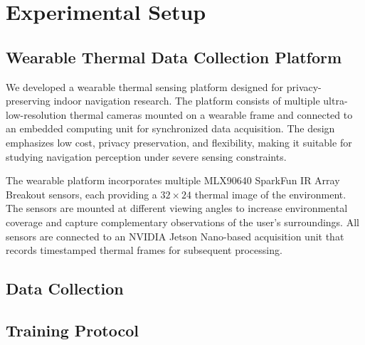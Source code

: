 \section{Experimental Setup}


\subsection{Wearable Thermal Data Collection Platform}

We developed a wearable thermal sensing platform designed for privacy-preserving indoor navigation research. The platform consists of multiple ultra-low-resolution thermal cameras mounted on a wearable frame and connected to an embedded computing unit for synchronized data acquisition. The design emphasizes low cost, privacy preservation, and flexibility, making it suitable for studying navigation perception under severe sensing constraints.



The wearable platform incorporates multiple MLX90640 SparkFun IR Array Breakout sensors, each providing a $32\times24$ thermal image of the environment. The sensors are mounted at different viewing angles to increase environmental coverage and capture complementary observations of the user's surroundings. All sensors are connected to an NVIDIA Jetson Nano-based acquisition unit that records timestamped thermal frames for subsequent processing.




\subsection{Data Collection}


\subsection{Training Protocol}


